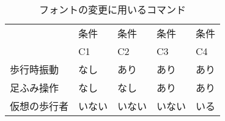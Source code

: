 \documentclass[uplatex]{jsarticle}   %
\begin{document}
\begin{table}
    \centering
    \caption{フォントの変更に用いるコマンド}
    \label{tab:fonts}
    \begin{tabular}[t]{|l|l|l|l|l|}
      \hline
       & 条件 & 条件 & 条件 & 条件\\
       & C1 & C2 & C3 &C4\\
      \hline
      歩行時振動 &なし&あり&あり&あり\\
      \hline
      足ふみ操作&なし&なし&あり&あり\\ 
      \hline
      仮想の歩行者&いない&いない&いない &いる\\
      \hline
    \end{tabular}
  \end{table}



\end{document}
